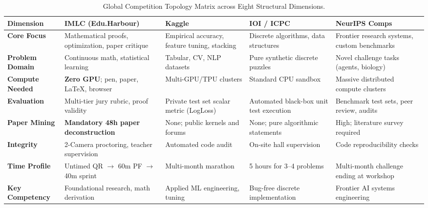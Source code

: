 \documentclass[11pt,a4paper]{article}
\theoremstyle{definition}
\theoremstyle{plain}
\theoremstyle{remark}
\begin{document}
\begin{table}[htbp]
\centering
\small
\caption{Global Competition Topology Matrix across Eight Structural Dimensions.}
\label{tab:competition_matrix}
\begin{tabularx}{\textwidth}{l p{2.8cm} p{2.8cm} p{2.8cm} p{3.2cm}}
\toprule
\textbf{Dimension} & \textbf{IMLC (Edu.Harbour)} & \textbf{Kaggle} & \textbf{IOI / ICPC} & \textbf{NeurIPS Comps} \\
\midrule
\textbf{Core Focus} & Mathematical proofs, optimization, paper critique & Empirical accuracy, feature tuning, stacking & Discrete algorithms, data structures & Frontier research systems, custom benchmarks \\
\textbf{Problem Domain} & Continuous math, statistical learning & Tabular, CV, NLP datasets & Pure synthetic discrete puzzles & Novel challenge tasks (agents, biology) \\
\textbf{Compute Needed} & \textbf{Zero GPU}; pen, paper, LaTeX, browser & Multi-GPU/TPU clusters & Standard CPU sandbox & Massive distributed compute clusters \\
\textbf{Evaluation} & Multi-tier jury rubric, proof validity & Private test set scalar metric (LogLoss) & Automated black-box unit test execution & Benchmark test sets, peer review, audits \\
\textbf{Paper Mining} & \textbf{Mandatory 48h paper deconstruction} & None; public kernels and forums & None; pure algorithmic statements & High; literature survey required \\
\textbf{Integrity} & 2-Camera proctoring, teacher supervision & Automated code audit & On-site hall supervision & Code reproducibility checks \\
\textbf{Time Profile} & Untimed QR $\to$ 60m PF $\to$ 40m sprint & Multi-month marathon & 5 hours for 3--4 problems & Multi-month challenge ending at workshop \\
\textbf{Key Competency} & Foundational research, math derivation & Applied ML engineering, tuning & Bug-free discrete implementation & Frontier AI systems engineering \\
\bottomrule
\end{tabularx}
\end{table}
\end{document}
